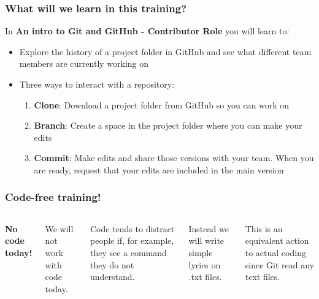 \documentclass[aspectratio=169]{beamer} %
\begin{document}
\begin{frame}
\frametitle{What will we learn in this training?}

	In \textbf{An intro to Git and GitHub - Contributor Role} you will learn to:

	\begin{itemize}
		\setlength\itemsep{5mm}
		\item Explore the history of a project folder in GitHub and see what different team members are currently working on
		\item <2-> Three ways to interact with a repository:
		\begin{enumerate}
			\setlength\itemsep{2mm}
			\item <3-> \textbf{Clone}: Download a project folder from GitHub so you can work on 
			\item <4-> \textbf{Branch}: Create a space in the project folder where you can make your edits
			\item <5-> \textbf{Commit}: Make edits and share those versions with your team. When you are ready, request that your edits are included in the main version
		\end{enumerate}
	\end{itemize}
\end{frame}


\begin{frame}
\frametitle{Code-free training!}

	\begin{columns}[c]


		\textbf{No code today!}

		\vspace{.5cm}

		We will not work with code today.

		\vspace{.25cm}

		Code tends to distract people if, for example, they see a command they do not understand.

		\vspace{.25cm}

		Instead we will write simple lyrics on .txt files.

		\vspace{.25cm}
		
		This is an equivalent action to actual coding since Git read any text files.
		


	\end{columns}
\end{frame}
\end{document}
